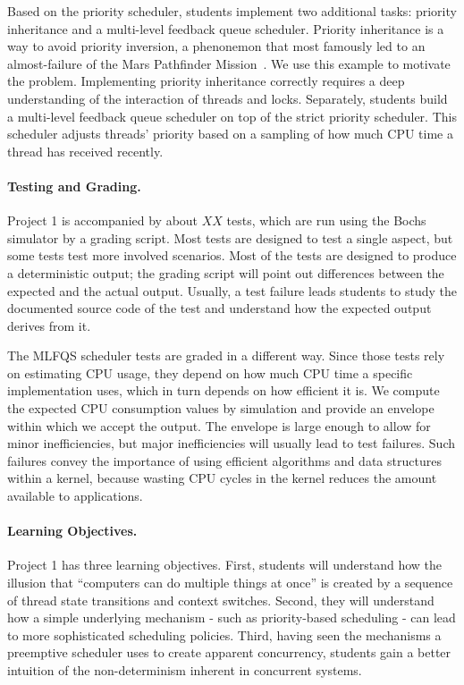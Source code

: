 Based on the priority scheduler, students implement two additional tasks: priority 
inheritance and a multi-level feedback queue scheduler.  Priority inheritance is a way
to avoid priority inversion, a phenonemon that most famously led to an almost-failure
of the Mars Pathfinder Mission~\cite{MarsPathFinder}.  We use this example to motivate
the problem.  Implementing priority inheritance correctly requires a deep understanding of the 
interaction of threads and locks.
Separately, students build a multi-level feedback queue scheduler on top of the strict
priority scheduler.  This scheduler adjusts threads' priority based on a sampling  of how
much CPU time a thread has received recently.

\paragraph{Testing and Grading.}
Project 1 is accompanied by about $XX$ tests, which are run using the Bochs simulator by
a grading script.  Most tests are designed to test a single aspect, but some tests 
test more involved scenarios.  Most of the tests are designed to produce a deterministic 
output; the grading script will point out differences between the expected and the actual output. 
Usually, a test failure leads students to study the documented source code of the test
and understand how the expected output derives from it.

The MLFQS scheduler tests are graded in a different way. Since those tests rely on estimating CPU
usage, they depend on how much CPU time a specific implementation uses, which in turn depends on how
efficient it is.  We compute the expected CPU consumption values by simulation and provide an
envelope within which we accept the output.  The envelope is large enough to allow for minor
inefficiencies, but major inefficiencies will usually lead to test failures.  Such failures
convey the importance of using efficient algorithms and data structures within a kernel,
because wasting CPU cycles in the kernel reduces the amount available to applications.

\paragraph{Learning Objectives.}
Project 1 has three learning objectives.  First, students will understand how
the illusion that ``computers can do multiple things at once'' is created by a sequence
of thread state transitions and context switches.  Second, they will understand how
a simple underlying mechanism - such as priority-based scheduling - can lead to more
sophisticated scheduling policies.  Third, having seen the mechanisms a preemptive scheduler
uses to create apparent concurrency, students gain a better intuition of the non-determinism
inherent in concurrent systems. 

